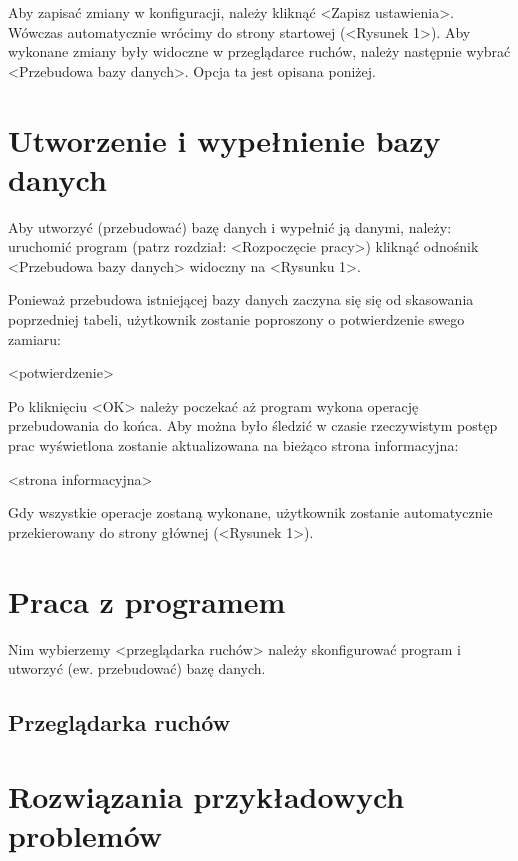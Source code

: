 \documentclass[10pt,leqno]{article}
\begin{document}
Aby zapisać zmiany w konfiguracji, należy kliknąć <Zapisz ustawienia>. Wówczas automatycznie wrócimy do strony startowej (<Rysunek 1>). 
Aby wykonane zmiany były widoczne w przeglądarce ruchów, należy następnie wybrać <Przebudowa bazy danych>. Opcja ta jest opisana poniżej.

\section{Utworzenie i wypełnienie bazy danych}
Aby utworzyć (przebudować) bazę danych i wypełnić ją danymi, należy: 
  uruchomić program (patrz rozdział: <Rozpoczęcie pracy>)
  kliknąć odnośnik <Przebudowa bazy danych> widoczny na <Rysunku 1>.

Ponieważ przebudowa istniejącej bazy danych zaczyna się się od skasowania poprzedniej tabeli, użytkownik zostanie
poproszony o potwierdzenie swego zamiaru:

<potwierdzenie>

Po kliknięciu <OK> należy poczekać aż program wykona operację przebudowania do końca. 
Aby można było śledzić w czasie rzeczywistym postęp prac wyświetlona zostanie aktualizowana na bieżąco strona informacyjna:

<strona informacyjna>

Gdy wszystkie operacje zostaną wykonane, użytkownik zostanie automatycznie przekierowany do strony głównej (<Rysunek 1>).

\section{Praca z programem}
Nim wybierzemy <przeglądarka ruchów> należy skonfigurować program i utworzyć (ew. przebudować) bazę danych.

\subsection{Przeglądarka ruchów}

\section{Rozwiązania przykładowych problemów}
\end{document}
